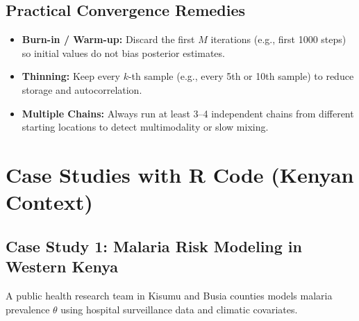 \documentclass[12pt,a4paper]{article}
\begin{document}
\subsection{Practical Convergence Remedies}

\begin{itemize}[leftmargin=1.5em]
    \item \textbf{Burn-in / Warm-up:} Discard the first $M$ iterations (e.g., first 1000 steps) so initial values do not bias posterior estimates.
    \item \textbf{Thinning:} Keep every $k$-th sample (e.g., every 5th or 10th sample) to reduce storage and autocorrelation.
    \item \textbf{Multiple Chains:} Always run at least 3--4 independent chains from different starting locations to detect multimodality or slow mixing.
\end{itemize}

\newpage

\section{Case Studies with R Code (Kenyan Context)}

\subsection{Case Study 1: Malaria Risk Modeling in Western Kenya}

A public health research team in Kisumu and Busia counties models malaria prevalence $\theta$ using hospital surveillance data and climatic covariates.
\end{document}
